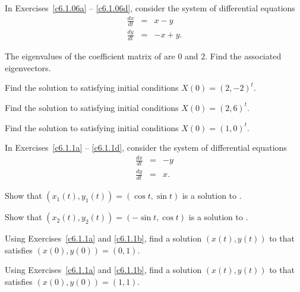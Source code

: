 \noindent In Exercises~\ref{c6.1.06a} -- \ref{c6.1.06d}, consider the system of
differential equations
\begin{equation} \label{Ex.1.06}
\begin{array}{rcr}
\frac{dx}{dt}  & = & x-y \\
\frac{dy}{dt}  & = & -x+y.
\end{array}
\end{equation}
\begin{exercise} \label{c6.1.06a}
The eigenvalues of the coefficient matrix of  are $0$ and $2$.
Find the associated eigenvectors.
\end{exercise}
\begin{exercise} \label{c6.1.06b}
Find the solution to  satisfying initial conditions
$X(0)=(2,-2)^t$.
\end{exercise}
\begin{exercise} \label{c6.1.06c}
Find the solution to  satisfying initial conditions
$X(0)=(2,6)^t$.
\end{exercise}
\begin{exercise} \label{c6.1.06d}
Find the solution to  satisfying initial conditions
$X(0)=(1,0)^t$.
\end{exercise}


\noindent In Exercises~\ref{c6.1.1a} -- \ref{c6.1.1d}, consider the system of
differential equations
\begin{equation} \label{E:c6.1.1}
\begin{array}{rcr}
\frac{dx}{dt}  & = & -y \\
\frac{dy}{dt}  & = &  x.
\end{array}
\end{equation}
\begin{exercise} \label{c6.1.1a}
Show that $(x_1(t),y_1(t)) = (\cos t,\sin t)$ is a solution to .
\end{exercise}
\begin{exercise} \label{c6.1.1b}
Show that $(x_2(t),y_2(t)) = (-\sin t,\cos t)$ is a solution to .
\end{exercise}
\begin{exercise} \label{c6.1.1c}
Using Exercises~\ref{c6.1.1a} and \ref{c6.1.1b}, find a solution $(x(t),y(t))$
to  that satisfies $(x(0),y(0)) = (0,1)$.
\end{exercise}
\begin{exercise} \label{c6.1.1d}
Using Exercises~\ref{c6.1.1a} and \ref{c6.1.1b}, find a solution $(x(t),y(t))$
to  that satisfies $(x(0),y(0)) = (1,1)$.
\end{exercise}

